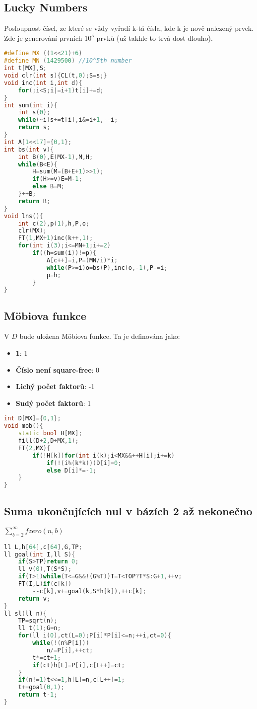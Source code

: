 \documentclass[11pt]{article}
\begin{document}
\subsection{Lucky Numbers}
Posloupnost čísel, ze které se vždy vyřadí \textsf{k}-tá čísla, kde \textsf{k} je nově nalezený prvek.
\\Zde je generování prvních $10^5$ prvků (už takhle to trvá dost dlouho).
\begin{lstlisting}[language=C++]
#define MX ((1<<21)+6)
#define MN (1429500) //10^5th number
int t[MX],S;
void clr(int s){CL(t,0);S=s;}
void inc(int i,int d){
    for(;i<S;i|=i+1)t[i]+=d;
}
int sum(int i){
    int s(0);
    while(~i)s+=t[i],i&=i+1,--i;
    return s;
}
int A[1<<17]={0,1};
int bs(int v){
    int B(0),E(MX-1),M,H;
    while(B<E){
        H=sum(M=(B+E+1)>>1);
        if(H>=v)E=M-1;
        else B=M;
    }++B;
    return B;
}
void lns(){
    int c(2),p(1),h,P,o;
    clr(MX);
    FT(1,MX+1)inc(k++,1);
    for(int i(3);i<=MN+1;i+=2)
        if((h=sum(i))!=p){
            A[c++]=i,P=(MN/i)*i;
            while(P>=i)o=bs(P),inc(o,-1),P-=i;
            p=h;
        }
}
\end{lstlisting}
\subsection{Möbiova funkce}
V $D$ bude uložena Möbiova funkce. Ta je definována jako:
\begin{itemize}
\item \textbf{1}: 1
\item \textbf{Číslo není square-free}: 0
\item \textbf{Lichý počet faktorů}: -1
\item \textbf{Sudý počet faktorů}: 1
\end{itemize}
\begin{lstlisting}[language=C++]
int D[MX]={0,1};
void mob(){
    static bool H[MX];
    fill(D+2,D+MX,1);
    FT(2,MX){
        if(!H[k])for(int i(k);i<MX&&++H[i];i+=k)
            if(!(i%(k*k)))D[i]=0;
            else D[i]*=-1;
    }
}
\end{lstlisting}
\subsection{Suma ukončujících nul v bázích 2 až nekonečno}
$\sum\limits_{b=2}^\infty fzero(n,b)$
\begin{lstlisting}[language=C++]
ll L,h[64],c[64],G,TP;
ll goal(int I,ll S){
    if(S>TP)return 0;
    ll v(0),T(S*S);
    if(T>1)while(T<=G&&!(G%T))T=T<TOP?T*S:G+1,++v;
    FT(I,L)if(c[k])
        --c[k],v+=goal(k,S*h[k]),++c[k];
    return v;
}
ll sl(ll n){
    TP=sqrt(n);
    ll t(1);G=n;
    for(ll i(0),ct(L=0);P[i]*P[i]<=n;++i,ct=0){
        while(!(n%P[i]))
            n/=P[i],++ct;
        t*=ct+1;
        if(ct)h[L]=P[i],c[L++]=ct;
    }
    if(n!=1)t<<=1,h[L]=n,c[L++]=1;
    t+=goal(0,1);
    return t-1;
}
\end{lstlisting}
\end{document}
